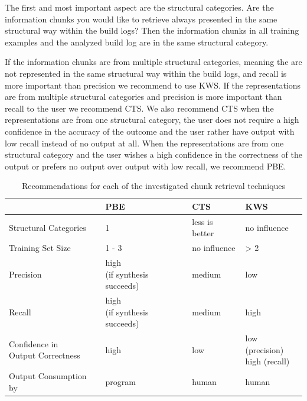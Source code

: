 \documentclass[\myrootdir/main.tex]{subfiles}
\begin{document}
The first and most important aspect are the structural categories.
Are the information chunks you would like to retrieve always presented in the same structural way within the build logs?
Then the information chunks in all training examples and the analyzed build log are in the same structural category.

If the information chunks are from multiple structural categories, meaning the are not represented in the same structural way within the build logs, and recall is more important than precision we recommend to use KWS\@.
If the representations are from multiple structural categories and precision is more important than recall to the user we recommend CTS\@.
We also recommend CTS when the representations are from one structural category, the user does not require a high confidence in the accuracy of the outcome and the user rather have output with low recall instead of no output at all.
When the representations are from one structural category and the user wishes a high confidence in the correctness of the output or prefers no output over output with low recall, we recommend PBE\@.

\begin{table}[htbp]
\centering
\begin{tabularx}{\textwidth}{@{}llll@{}}
  \toprule
  & PBE & CTS & KWS \\
  \midrule
  Structural Categories & 1 & less is better & no influence \\
  Training Set Size & 1 - 3 & no influence & > 2 \\ 
  Precision & \makecell[l]{high \\ (if synthesis succeeds)} & medium & low \\ 
  Recall & \makecell[l]{high \\ (if synthesis succeeds)} & medium & high \\ 
  \makecell[l]{Confidence in \\ Output Correctness} & high & low & \makecell[l]{low (precision) \\ high (recall)} \\ 
  Output Consumption by & program & human & human \\ 
  \bottomrule
\end{tabularx}
\caption{Recommendations for each of the investigated chunk retrieval techniques}
\label{tab:single-technique-recommendations}
\end{table}
\end{document}
